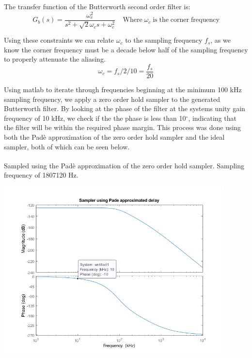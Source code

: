 \documentclass[a4paper,11pt]{article}
\begin{document}
\begin{preview}
\begin{enumerate}
The transfer function of the Butterworth second order filter is:
$$ G_b (s) = \frac{\omega_c^2}{s^2 + \sqrt{2}\omega_c s + \omega_c^2} \;\;\;\; \mathrm{Where \;} \omega_c \mathrm{\; is \; the \; corner \; frequency}$$ 

Using these constraints we can relate $\omega_c$ to the sampling frequency $f_s$, as we know the corner frequency must be a decade below half of the sampling frequency to properly attenuate the aliasing.
$$ \omega_c = f_s /2 / 10 = \frac{f_s}{20}$$

Using matlab to iterate through frequencies beginning at the minimum 100 kHz sampling frequency, we apply a zero order hold sampler to the generated Butterworth filter. By looking at the phase of the filter at the systems unity gain frequency of 10 kHz, we check if the the phase is less than 10$^\circ$, indicating that the filter will be within the required phase margin. This process was done using both the Pad\`{e} approximation of the zero order hold sampler and the ideal sampler, both of which can be seen below. \\\\


Sampled using the Pad\`{e} approximation of the zero order hold sampler. Sampling frequency of 1807120 Hz.
\begin{center}
  \includegraphics[width=0.9\textwidth]{Summative/butterworth_sample_pade.png}
\end{center}


\end{enumerate}
\end{preview}
\end{document}
